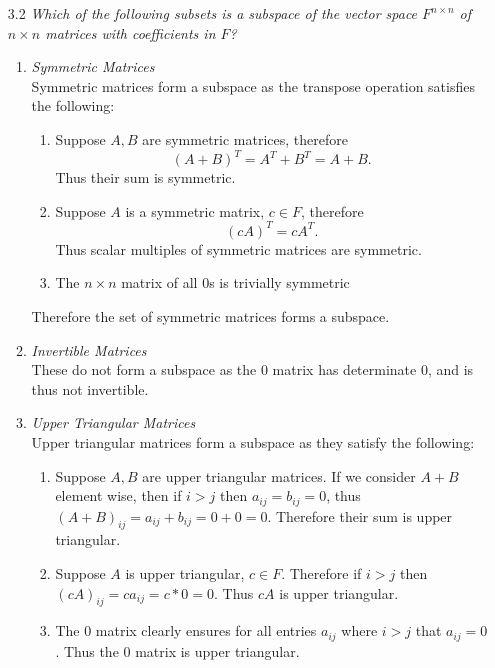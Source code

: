 \documentclass[12pt, letterpaper]{article}
\begin{document}
\begin{enumerate}
	\item[3.2]\textit{Which of the following subsets is a subspace of the vector space $F^{n\times n}$ of $n \times n$ matrices
with coefficients in $F$?}
	\begin{enumerate}
		\item \textit{Symmetric Matrices}\\
		Symmetric matrices form a subspace as the transpose operation satisfies the following:
		\begin{enumerate}
			\item Suppose $A,B$ are symmetric matrices, therefore
			$$(A+B)^T = A^T + B^T = A + B.$$  Thus their sum is symmetric.
			\item Suppose $A$ is a symmetric matrix, $c \in F$, therefore
			$$(cA)^T = cA^T.$$
			Thus scalar multiples of symmetric matrices are symmetric.
			\item The $n \times n$ matrix of all 0s is trivially symmetric  
		\end{enumerate}
		Therefore the set of symmetric matrices forms a subspace.
		\item \textit{Invertible Matrices }\\
		These do not form a subspace as the 0 matrix has determinate 0, and is thus not invertible. 
		\item \textit{Upper Triangular Matrices}\\
		Upper triangular matrices form a subspace as they satisfy the following:
		\begin{enumerate}
			\item Suppose $A,B$ are upper triangular matrices.  If we consider $A+B$ element wise, 
			then if $i > j$ then $a_{ij} = b_{ij} = 0$, thus $(A+B)_{ij} = a_{ij} + b_{ij} = 0 + 0 = 0$.  Therefore their sum is upper triangular.
			\item Suppose $A$ is upper triangular, $c \in F$.  Therefore if $i > j$ then $(cA)_{ij} = c a_{ij} = c * 0 = 0$.  Thus $cA$ is upper triangular.
			\item The 0 matrix clearly ensures for all entries $a_{ij}$ where $i>j$ that $a_{ij} = 0$.  Thus the 0 matrix is upper triangular.    
		\end{enumerate}
	\end{enumerate}
\end{enumerate}
\end{document}
